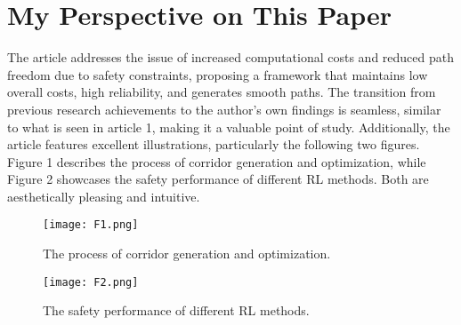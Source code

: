 \section{My Perspective on This Paper}
The article addresses the issue of increased computational costs and reduced path freedom due to safety constraints, proposing a framework that maintains low overall costs, high reliability, and generates smooth paths. The transition from previous research achievements to the author's own findings is seamless, similar to what is seen in article 1, making it a valuable point of study. Additionally, the article features excellent illustrations, particularly the following two figures. Figure 1 describes the process of corridor generation and optimization, while Figure 2 showcases the safety performance of different RL methods. Both are aesthetically pleasing and intuitive.
    	\begin{figure}[H]
    		\centering
    		\texttt{[image: F1.png]}
    		\caption{The process of corridor generation and optimization.}
    		\label{fig:figure}
    	\end{figure}
    	\begin{figure}[H]
    		\centering
    		\texttt{[image: F2.png]}
    		\caption{The safety performance of different RL methods.}
    		\label{fig:figure}
    	\end{figure}

%
%
%
